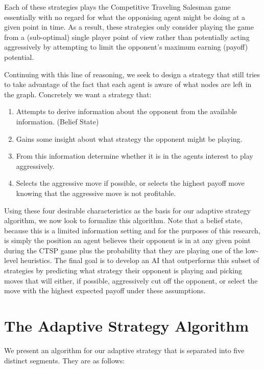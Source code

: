 \documentclass[pageno]{jpaper}
\begin{document}
Each of these strategies plays the Competitive Traveling Salesman game essentially with no regard for what the opponising agent might be doing at a given point in time. As a result, these strategies only consider playing the game from a (sub-optimal) single player point of view rather than potentially acting aggressively by attempting to limit the opponent's maximum earning (payoff) potential.\par 

Continuing with this line of reasoning, we seek to design a strategy that still tries to take advantage of the fact that each agent is aware of what nodes are left in the graph. Concretely we want a strategy that:\newline

\begin{enumerate}
	\item Attempts to derive information about the opponent from the available information. (Belief State)
	\item Gains some insight about what strategy the opponent might be playing.
	\item From this information determine whether it is in the agents interest to play aggressively.
	\item Selects the aggressive move if possible, or selects the highest payoff move knowing that the aggressive move is not profitable.
\end{enumerate}

Using these four desirable characteristics as the basis for our adaptive strategy algorithm, we now look to formalize this algorithm. Note that a belief state, because this is a limited information setting and for the purposes of this research, is simply the position an agent believes their opponent is in at any given point during the CTSP game plus the probability that they are playing one of the low-level heuristics.
The final goal is to develop an AI that outperforms this subset of strategies by predicting what strategy their opponent is playing and picking moves that will either, if possible, aggressively cut off the opponent, or select the move with the highest expected payoff under these assumptions.\newline

\section{The Adaptive Strategy Algorithm}

We present an algorithm for our adaptive strategy that is separated into five distinct segments. They are as follows:\newline
\end{document}
